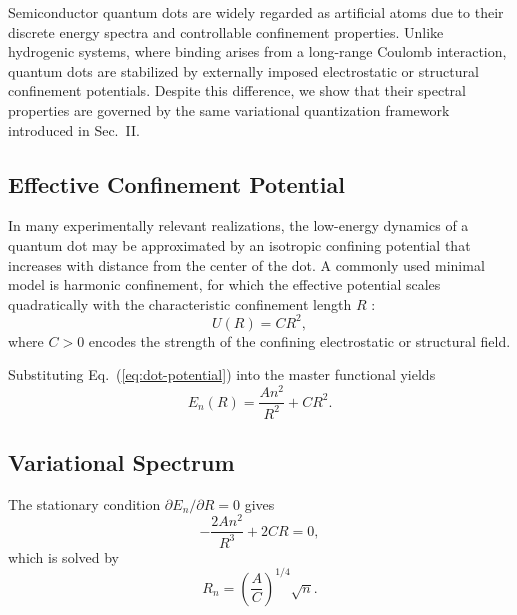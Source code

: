 \documentclass[11pt]{article}
\begin{document}
        Semiconductor quantum dots are widely regarded as artificial atoms due to their discrete energy spectra and controllable confinement properties. Unlike hydrogenic systems, where binding arises from a long-range Coulomb interaction, quantum dots are stabilized by externally imposed electrostatic or structural confinement potentials. Despite this difference, we show that their spectral properties are governed by the same variational quantization framework introduced in Sec.~II.

        \subsection{Effective Confinement Potential}

            In many experimentally relevant realizations, the low-energy dynamics of a quantum dot may be approximated by an isotropic confining potential that increases with distance from the center of the dot. A commonly used minimal model is harmonic confinement, for which the effective potential scales quadratically with the characteristic confinement length $R$ \cite{Kouwenhoven2001}:
            \begin{equation}
                U(R) = C R^2,
                \label{eq:dot-potential}
            \end{equation}
            where $C>0$ encodes the strength of the confining electrostatic or structural field.

            Substituting Eq.~(\ref{eq:dot-potential}) into the master functional yields
            \begin{equation}
                E_n(R)=\frac{A n^2}{R^2}+C R^2.
                \label{eq:dot-functional}
            \end{equation}

        \subsection{Variational Spectrum}

            The stationary condition $\partial E_n/\partial R=0$ gives
            \begin{equation}
                -\frac{2A n^2}{R^3}+2C R=0,
            \end{equation}
            which is solved by
            \begin{equation}
                R_n=\left(\frac{A}{C}\right)^{1/4}\sqrt{n}.
                \label{eq:dot-radius}
            \end{equation}
\end{document}
